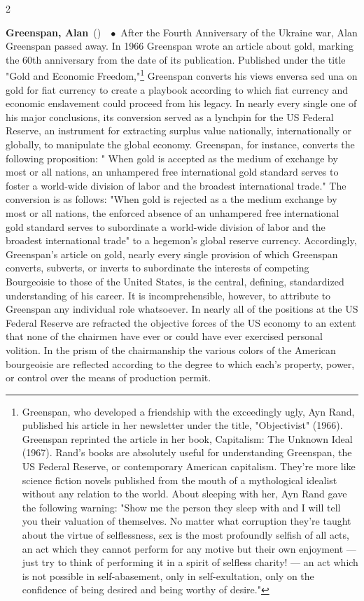 \documentclass[10pt,a4paper,twoside]{article} %
\newcommand{\entry}[4]{\markboth{#1}{#1}\textbf{#1}\ {(#2)}\ \textit{#3}\ $\bullet$\ {#4}}  %
\begin{document}
\begin{multicols}{2}
\entry{Greenspan, Alan} {} {} {After the Fourth Anniversary of the Ukraine war, Alan Greenspan passed away. In 1966 Greenspan wrote an article about gold, marking the 60th anniversary from the date of its publication. Published under the title "Gold and Economic Freedom,"\footnote{Greenspan, who developed a friendship with the exceedingly ugly, Ayn Rand, published his article in her newsletter under the title, "Objectivist" (1966). Greenspan reprinted the article in her book, Capitalism: The Unknown Ideal (1967). Rand's books are absolutely useful for understanding Greenspan, the US Federal Reserve, or contemporary American capitalism. They're more like science fiction novels published from the mouth of a mythological idealist without any relation to the world. About sleeping with her, Ayn Rand gave the following warning: "Show me the person they sleep with and I will tell you their valuation of themselves. No matter what corruption they’re taught about the virtue of selflessness, sex is the most profoundly selfish of all acts, an act which they cannot perform for any motive but their own enjoyment — just try to think of performing it in a spirit of selfless charity! — an act which is not possible in self-abasement, only in self-exultation, only on the confidence of being desired and being worthy of desire."} Greenspan converts his views enversa sed una on gold for fiat currency to create a playbook according to which fiat currency and economic enslavement could proceed from his legacy. In nearly every single one of his major conclusions, its conversion served as a lynchpin for the US Federal Reserve, an instrument for extracting surplus value nationally, internationally or globally, to manipulate the global economy. Greenspan, for instance, converts the following proposition: " When gold is accepted as the medium of exchange by most or all nations, an unhampered free international gold standard serves to foster a world-wide division of labor and the broadest international trade." The conversion is as follows: "When gold is rejected as a the medium exchange by most or all nations, the enforced absence of an unhampered free international gold standard serves to subordinate a world-wide division of labor and the broadest international trade" to a hegemon's global reserve currency. Accordingly, Greenspan's article on gold, nearly every single provision of which Greenspan converts, subverts, or inverts to subordinate the interests of competing Bourgeoisie to those of the United States, is the central, defining, standardized understanding of his career. It is incomprehensible, however, to attribute to Greenspan any individual role whatsoever. In nearly all of the positions at the US Federal Reserve are refracted the objective forces of the US economy to an extent that none of the chairmen have ever or could have ever exercised personal volition. In the prism of the chairmanship the various colors of the American bourgeoisie are reflected according to the degree to which each's property, power, or control over the means of production permit.
} 


\end{multicols}
\end{document}
